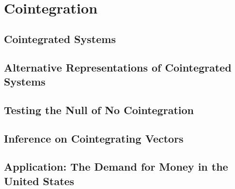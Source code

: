 
\chapter{Cointegration}
\label{ch:cointegration}

\section{Cointegrated Systems}
\label{sec:10.1}


\section{Alternative Representations of Cointegrated Systems}
\label{sec:10.2}


\section{Testing the Null of No Cointegration}
\label{sec:10.3}


\section{Inference on Cointegrating Vectors}
\label{sec:10.4}


\section{Application: The Demand for Money in the United States}
\label{sec:10.5}



